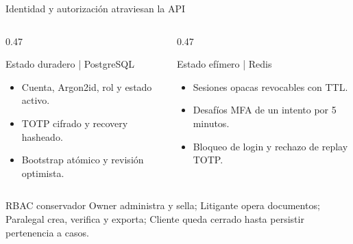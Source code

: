 \documentclass[aspectratio=169,11pt]{beamer}
\begin{document}
\begin{frame}{Identidad y autorización atraviesan la API}
  \begin{columns}[T,onlytextwidth]
    \begin{column}{0.47\textwidth}
      \begin{block}{Estado duradero | PostgreSQL}
        \footnotesize
        \begin{itemize}
          \item Cuenta, Argon2id, rol y estado activo.
          \item TOTP cifrado y recovery hasheado.
          \item Bootstrap atómico y revisión optimista.
        \end{itemize}
      \end{block}
    \end{column}
    \begin{column}{0.47\textwidth}
      \begin{block}{Estado efímero | Redis}
        \footnotesize
        \begin{itemize}
          \item Sesiones opacas revocables con TTL.
          \item Desafíos MFA de un intento por 5 minutos.
          \item Bloqueo de login y rechazo de replay TOTP.
        \end{itemize}
      \end{block}
    \end{column}
  \end{columns}

  \begin{alertblock}{RBAC conservador}
    \footnotesize Owner administra y sella; Litigante opera documentos; Paralegal crea,
    verifica y exporta; Cliente queda cerrado hasta persistir pertenencia a casos.
  \end{alertblock}
\end{frame}


\end{document}

